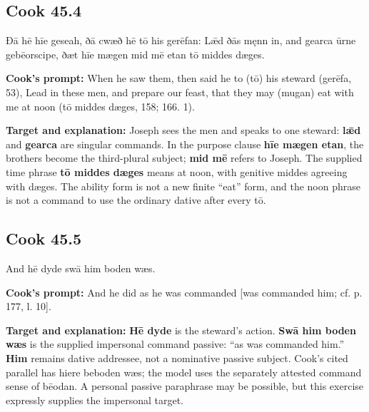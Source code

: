 \par\begin{minipage}{\linewidth}\raggedright
\subsection*{Cook 45.4}

Ðā hē hīe geseah, ðā cwæð hē tō his gerēfan: Lǣd ðās męnn in, and gearca ūrne gebēorscipe, ðæt hīe mægen mid mē etan tō middes dæges.

\textbf{Cook’s prompt:} When he saw them, then said he to (tō) his steward (gerēfa, 53), Lead in these men, and prepare our feast, that they may (mugan) eat with me at noon (tō middes dæges, 158; 166. 1).

\textbf{Target and explanation:} Joseph sees the men and speaks to one steward: \textbf{lǣd} and \textbf{gearca} are singular commands. In the purpose clause \textbf{hīe mægen etan}, the brothers become the third-plural subject; \textbf{mid mē} refers to Joseph. The supplied time phrase \textbf{tō middes dæges} means at noon, with genitive middes agreeing with dæges. The ability form is not a new finite “eat” form, and the noon phrase is not a command to use the ordinary dative after every tō.

\end{minipage}\par\addvspace{4pt}

\par\begin{minipage}{\linewidth}\raggedright
\subsection*{Cook 45.5}

And hē dyde swā him boden wæs.

\textbf{Cook’s prompt:} And he did as he was commanded [was commanded him; cf. p. 177, l. 10].

\textbf{Target and explanation:} \textbf{Hē dyde} is the steward’s action. \textbf{Swā him boden wæs} is the supplied impersonal command passive: “as was commanded him.” \textbf{Him} remains dative addressee, not a nominative passive subject. Cook’s cited parallel has hiere beboden wæs; the model uses the separately attested command sense of bēodan. A personal passive paraphrase may be possible, but this exercise expressly supplies the impersonal target.

\end{minipage}\par\addvspace{4pt}

